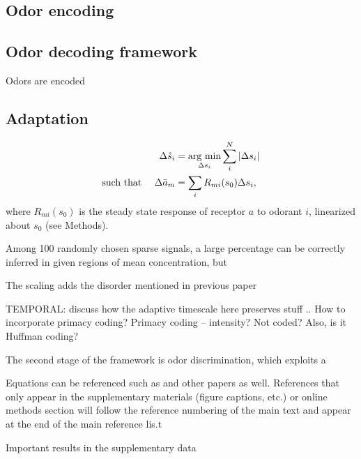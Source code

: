 \subsection{Odor encoding}

\subsection{Odor decoding framework}

Odors are encoded 

\subsection{Adaptation}

\begin{align}
\Delta \hat s_i &= \underset{\Delta s_i}{\text{arg min}} \sum_i^N|\Delta s_i| \\
\text{such that  \quad} 
\Delta \bar a_m &= \sum_i R_{mi}(s_0) \Delta s_i,
\end{align}
where $R_{mi}(s_0)$ is the steady state response of receptor $a$ to odorant $i$, linearized about $s_0$ (see Methods). 

Among 100 randomly chosen sparse signals, a large percentage can be correctly inferred in given regions of mean concentration, but 







The scaling adds the disorder mentioned in previous paper

TEMPORAL: discuss how the adaptive timescale here preserves stuff .. How to incorporate primacy coding?
Primacy coding -- intensity? Not coded? Also, is it Huffman coding?

The second stage of the framework is odor discrimination, which exploits a 



Equations can be referenced such as and other papers as well. References
that only appear in the supplementary materials (figure captions, etc.) or online methods section
will follow the reference numbering of the main text and appear at the end of the main reference
lis.t

Important results in the supplementary data

